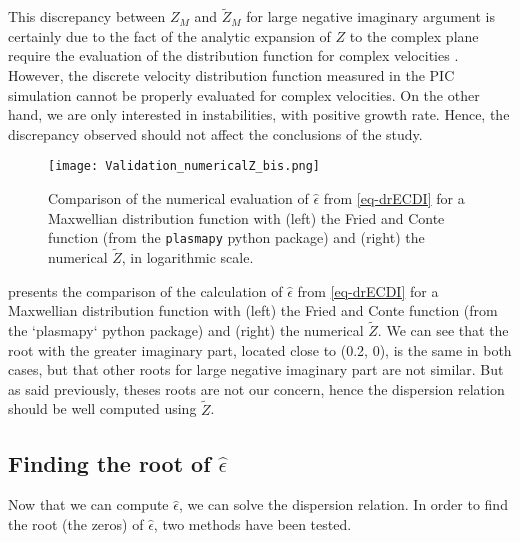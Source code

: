   This discrepancy between $Z_M$ and $\tilde{Z}_M$ for large negative imaginary argument is certainly due to the fact of the analytic expansion of $Z$ to the complex plane require the evaluation of the distribution function for complex velocities \citep{xie2013,weideman1995}.
  However, the discrete velocity distribution function measured in the \ac{PIC} simulation cannot be properly evaluated for complex velocities.
  On the other hand, we are only interested in instabilities, with positive growth rate.
  Hence, the discrepancy observed should not affect the conclusions of the study.
  


  \begin{figure}[hbtp]
    \centering
    \texttt{[image: Validation\_numericalZ\_bis.png]}
    \caption{Comparison of the numerical evaluation of $\hat\epsilon$ from \cref{eq-drECDI} for a Maxwellian distribution function with (left) the Fried and Conte function (from the \texttt{plasmapy} python package) and (right) the numerical $\tilde{Z}$, in logarithmic scale.  }
    \label{fig-numZbis}
  \end{figure}
  
   presents the comparison of the calculation of $\hat\epsilon$ from \cref{eq-drECDI} for a Maxwellian distribution function with (left) the Fried and Conte function (from the `plasmapy` python package) and (right) the numerical $\tilde{Z}$.
  We can see that the root with the greater imaginary part, located close to (0.2, 0), is the same in both cases, but that other roots for large negative imaginary part are not similar.
  But as said previously, theses roots are not our concern, hence the dispersion relation should be well computed using $\tilde{Z}$.
  
  
  \subsection{Finding the root of $\hat\epsilon$}
  Now that we can compute $\hat\epsilon$, we can solve the dispersion relation.
  In order to find the root (the zeros) of $\hat\epsilon$, two methods have been tested.
  
  

